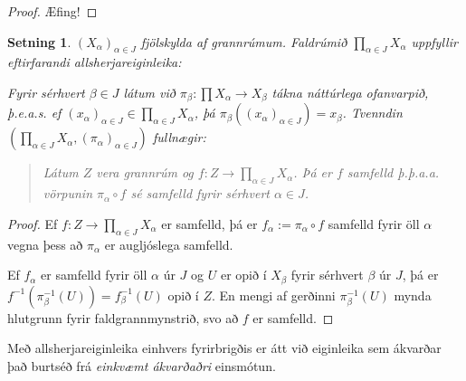 \documentclass[a4paper,icelandic]{book}
\theoremstyle{definition}
\theoremstyle{plain}
\newtheorem{setn}{Setning}[section]
\theoremstyle{remark}
\begin{document}
\begin{proof}
  Æfing!
\end{proof}
\begin{setn}
  $(X_\alpha)_{\alpha\in J}$ fjölskylda af grannrúmum. Faldrúmið
  $\prod_{\alpha\in J}X_\alpha$ uppfyllir eftirfarandi allsherjareiginleika:

  Fyrir sérhvert $\beta\in J$ látum við $\pi_\beta:\prod X_\alpha\to X_\beta$
  tákna náttúrlega ofanvarpið, þ.e.a.s. ef $(x_\alpha)_{\alpha\in
  J}\in\prod_{\alpha\in J}X_\alpha$, þá $\pi_\beta( (x_\alpha)_{\alpha\in J})
  = x_\beta$. Tvenndin $\left( \prod_{\alpha\in J}X_\alpha,
  (\pi_\alpha)_{\alpha\in J} \right)$ fullnægir:

  \begin{quote}
    Látum $Z$ vera grannrúm og $f:Z\to \prod_{\alpha\in J}X_\alpha$. Þá er
    $f$ samfelld \emph{þ.þ.a.a.} vörpunin $\pi_\alpha\circ f$ sé samfelld
    fyrir sérhvert $\alpha\in J$.
  \end{quote}
\end{setn}
\begin{proof}
  Ef $f:Z\to\prod_{\alpha\in J}X_\alpha$ er samfelld, þá er
  $f_\alpha:=\pi_\alpha\circ f$ samfelld fyrir öll $\alpha$ vegna þess að
  $\pi_\alpha$ er augljóslega samfelld.

  Ef $f_\alpha$ er samfelld fyrir öll $\alpha$ úr $J$ og $U$ er opið í
  $X_\beta$ fyrir sérhvert $\beta$ úr $J$, þá er $f^{-1}(\pi^{-1}_\beta
  (U)) = f^{-1}_\beta (U)$ opið í $Z$. En mengi af gerðinni $\pi^{-1}_\beta(U)$
  mynda hlutgrunn fyrir faldgrannmynstrið, svo að $f$ er samfelld.
\end{proof}
Með allsherjareiginleika einhvers fyrirbrigðis er átt við eiginleika sem
ákvarðar það burtséð frá \emph{einkvæmt ákvarðaðri} einsmótun.
\end{document}
